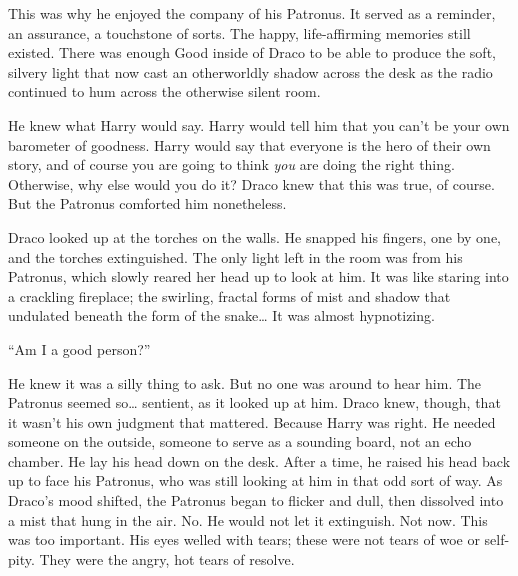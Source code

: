 
This was why he enjoyed the company of his Patronus. It served as a reminder, an assurance, a touchstone of sorts. The happy, life-affirming memories still existed. There was enough Good inside of Draco to be able to produce the soft, silvery light that now cast an otherworldly shadow across the desk as the radio continued to hum across the otherwise silent room.

He knew what Harry would say. Harry would tell him that you can’t be your own barometer of goodness. Harry would say that everyone is the hero of their own story, and of course you are going to think \emph{you} are doing the right thing. Otherwise, why else would you do it? Draco knew that this was true, of course. But the Patronus comforted him nonetheless.

Draco looked up at the torches on the walls. He snapped his fingers, one by one, and the torches extinguished. The only light left in the room was from his Patronus, which slowly reared her head up to look at him. It was like staring into a crackling fireplace; the swirling, fractal forms of mist and shadow that undulated beneath the form of the snake… It was almost hypnotizing.

“Am I a good person?”


He knew it was a silly thing to ask. But no one was around to hear him. The Patronus seemed so… sentient, as it looked up at him. Draco knew, though, that it wasn’t his own judgment that mattered. Because Harry was right. He needed someone on the outside, someone to serve as a sounding board, not an echo chamber. He lay his head down on the desk.
\SmallVSpace
After a time, he raised his head back up to face his Patronus, who was still looking at him in that odd sort of way. As Draco’s mood shifted, the Patronus began to flicker and dull, then dissolved into a mist that hung in the air. No. He would not let it extinguish. Not now. This was too important. His eyes welled with tears; these were not tears of woe or self-pity. They were the angry, hot tears of resolve.

